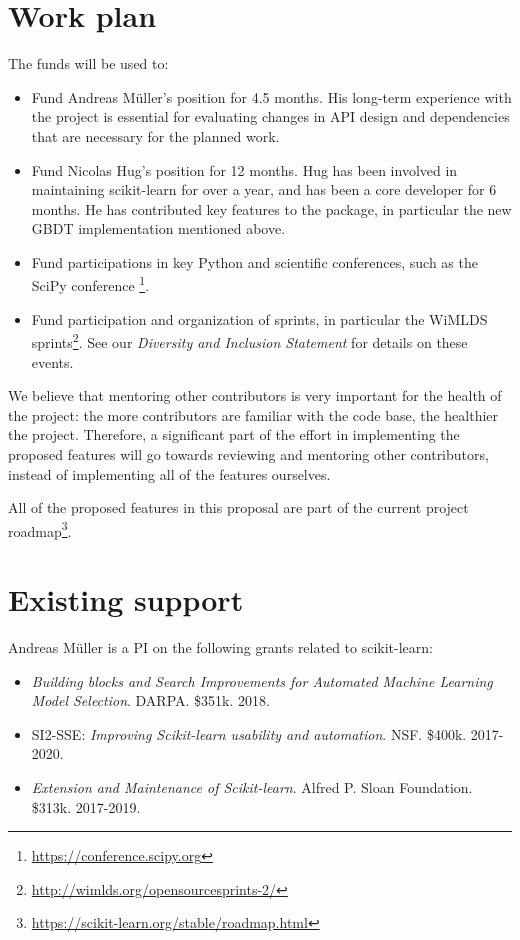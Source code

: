 \documentclass[11pt]{article}  %
\begin{document}
\section{Work plan}
The funds will be used to:
\begin{itemize}
\item Fund Andreas M\"uller's position for 4.5 months. His long-term experience with the project is essential for evaluating changes in API design and dependencies that are necessary for the planned work.
\item Fund Nicolas Hug's position for 12 months. Hug has been involved in
maintaining scikit-learn for over a year, and has been a core developer for 6 months. He has contributed key features
to the package, in particular the new GBDT implementation mentioned above.
\item Fund participations in key Python and scientific conferences,
such as the SciPy conference
\footnote{\href{https://conference.scipy.org/}{https://conference.scipy.org}}.
\item Fund participation and organization of sprints, in particular the WiMLDS sprints\footnote{\href{http://wimlds.org/opensourcesprints-2/}{http://wimlds.org/opensourcesprints-2/}}. See our \textit{Diversity and Inclusion Statement} for details on these events.
\end{itemize}

We believe that mentoring other contributors is very important for the
health of the project: the more contributors are familiar with the code
base, the healthier the project. Therefore, a significant part of the effort in
implementing the proposed features will go towards reviewing and
mentoring other contributors, instead of implementing all of the features
ourselves.

All of the proposed features in this proposal are part of the current
project
roadmap\footnote{\href{https://scikit-learn.org/stable/roadmap.html}{https://scikit-learn.org/stable/roadmap.html}}.


\section{Existing support}

 Andreas M\"uller is a PI on the following grants related to scikit-learn:

\begin{itemize}
    \item \textit{Building blocks and Search Improvements for Automated Machine Learning Model Selection}. DARPA. \$351k.  2018.
    \item SI2-SSE: \textit{Improving Scikit-learn usability and automation}. NSF. \$400k.  2017-2020.
    \item \textit{Extension and Maintenance of Scikit-learn}. Alfred P. Sloan Foundation. \$313k.  2017-2019.
\end{itemize}
\end{document}

